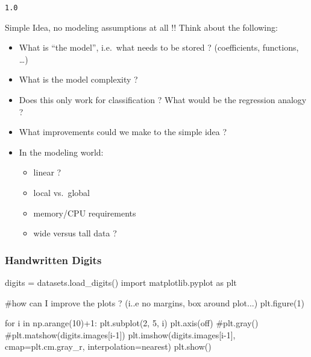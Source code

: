 \documentclass[
  letterpaper,
  DIV=11,
  numbers=noendperiod]{scrreprt}
\newenvironment{Shaded}{\begin{snugshade}}{\end{snugshade}}
\newcommand{\CommentTok}[1]{\textcolor[rgb]{0.37,0.37,0.37}{#1}}
\newcommand{\ControlFlowTok}[1]{\textcolor[rgb]{0.00,0.23,0.31}{#1}}
\newcommand{\DecValTok}[1]{\textcolor[rgb]{0.68,0.00,0.00}{#1}}
\newcommand{\ImportTok}[1]{\textcolor[rgb]{0.00,0.46,0.62}{#1}}
\newcommand{\KeywordTok}[1]{\textcolor[rgb]{0.00,0.23,0.31}{#1}}
\newcommand{\NormalTok}[1]{\textcolor[rgb]{0.00,0.23,0.31}{#1}}
\newcommand{\OperatorTok}[1]{\textcolor[rgb]{0.37,0.37,0.37}{#1}}
\newcommand{\StringTok}[1]{\textcolor[rgb]{0.13,0.47,0.30}{#1}}
\providecommand{\tightlist}{%
  \setlength{\itemsep}{0pt}\setlength{\parskip}{0pt}}\usepackage{longtable,booktabs,array}
\begin{document}
\begin{verbatim}
1.0
\end{verbatim}

Simple Idea, no modeling assumptions at all !! Think about the
following:

\begin{itemize}
\tightlist
\item
  What is ``the model'', i.e.~what needs to be stored ? (coefficients,
  functions, \ldots)
\item
  What is the model complexity ?
\item
  Does this only work for classification ? What would be the regression
  analogy ?
\item
  What improvements could we make to the simple idea ?
\item
  In the modeling world:

  \begin{itemize}
  \tightlist
  \item
    linear ?
  \item
    local vs.~global
  \item
    memory/CPU requirements
  \item
    wide versus tall data ?
  \end{itemize}
\end{itemize}

\hypertarget{handwritten-digits}{%
\subsubsection{Handwritten Digits}\label{handwritten-digits}}

\begin{Shaded}
\begin{Highlighting}[]
\NormalTok{digits }\OperatorTok{=}\NormalTok{ datasets.load\_digits()}
\ImportTok{import}\NormalTok{ matplotlib.pyplot }\ImportTok{as}\NormalTok{ plt}

\CommentTok{\#how can I improve the plots ? (i..e no margins, box around plot...)}
\NormalTok{plt.figure(}\DecValTok{1}\NormalTok{)}

\ControlFlowTok{for}\NormalTok{ i }\KeywordTok{in}\NormalTok{ np.arange(}\DecValTok{10}\NormalTok{)}\OperatorTok{+}\DecValTok{1}\NormalTok{:}
\NormalTok{    plt.subplot(}\DecValTok{2}\NormalTok{, }\DecValTok{5}\NormalTok{, i)}
\NormalTok{    plt.axis(}\StringTok{\textquotesingle{}off\textquotesingle{}}\NormalTok{)}
    \CommentTok{\#plt.gray() }
    \CommentTok{\#plt.matshow(digits.images[i{-}1]) }
\NormalTok{    plt.imshow(digits.images[i}\OperatorTok{{-}}\DecValTok{1}\NormalTok{], cmap}\OperatorTok{=}\NormalTok{plt.cm.gray\_r, interpolation}\OperatorTok{=}\StringTok{\textquotesingle{}nearest\textquotesingle{}}\NormalTok{)}
\NormalTok{plt.show() }
\end{Highlighting}
\end{Shaded}
\end{document}
